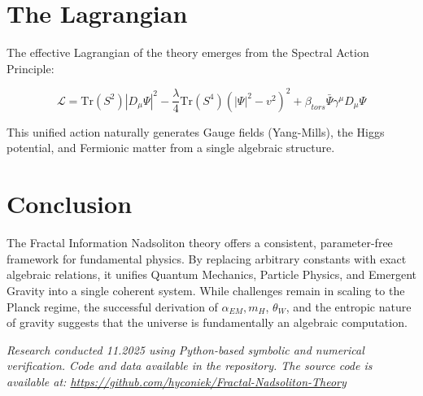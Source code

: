 \documentclass[11pt, a4paper]{article}
\begin{document}
\section{The Lagrangian}
The effective Lagrangian of the theory emerges from the Spectral Action Principle:

\begin{equation}
\mathcal{L} = \text{Tr}(S^2) |D_\mu \Psi|^2 - \frac{\lambda}{4} \text{Tr}(S^4) (|\Psi|^2 - v^2)^2 + \beta_{tors} \bar{\Psi} \gamma^\mu D_\mu \Psi
\end{equation}

This unified action naturally generates Gauge fields (Yang-Mills), the Higgs potential, and Fermionic matter from a single algebraic structure.

\section{Conclusion}
The Fractal Information Nadsoliton theory offers a consistent, parameter-free framework for fundamental physics. By replacing arbitrary constants with exact algebraic relations, it unifies Quantum Mechanics, Particle Physics, and Emergent Gravity into a single coherent system. While challenges remain in scaling to the Planck regime, the successful derivation of $\alpha_{EM}, m_H$, $\theta_W$, and the entropic nature of gravity suggests that the universe is fundamentally an algebraic computation.

\vspace{1cm}
\textit{\small Research conducted 11.2025 using Python-based symbolic and numerical verification. Code and data available in the repository.
The source code is available at: \url{https://github.com/hyconiek/Fractal-Nadsoliton-Theory}}
\end{document}
